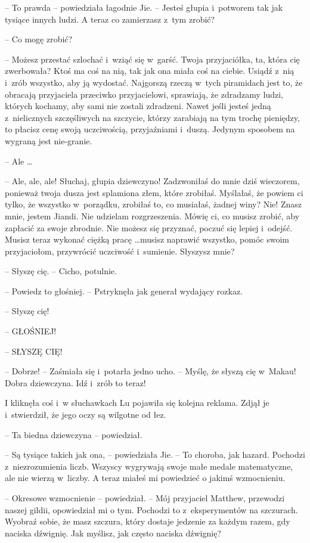 \documentclass[oneside,polish,11pt,rmheadings]{mwbk}
\begin{document}
-- To prawda -- powiedziała łagodnie Jie. -- Jesteś głupia i~potworem tak jak tysiące innych ludzi. A teraz co zamierzasz z~tym zrobić? 

-- Co mogę zrobić? 

-- Możesz przestać szlochać i~wziąć się w~garść. Twoja przyjaciółka, ta, która cię zwerbowała? Ktoś ma coś na nią, tak jak ona miała coś na ciebie. Usiądź z~nią i~zrób wszystko, aby ją wydostać. Najgorszą rzeczą w~tych piramidach jest to, że obracają przyjaciela przeciwko przyjacielowi, sprawiają, że zdradzamy ludzi, których kochamy, aby sami nie zostali zdradzeni. Nawet jeśli jesteś jedną z~nielicznych szczęśliwych na szczycie, którzy zarabiają na tym trochę pieniędzy, to płacisz cenę swoją uczciwością, przyjaźniami i~duszą. Jedynym sposobem na wygraną jest nie-granie.

-- Ale  \ldots 

-- Ale, ale, ale! Słuchaj, głupia dziewczyno! Zadzwoniłaś do mnie dziś wieczorem, ponieważ twoja dusza jest splamiona złem, które zrobiłaś. Myślałaś, że powiem ci tylko, że wszystko w~porządku, zrobiłaś to, co musiałaś, żadnej winy? Nie! Znasz mnie, jestem Jiandi. Nie udzielam rozgrzeszenia. Mówię ci, co musisz zrobić, aby zapłacić za swoje zbrodnie. Nie możesz się przyznać, poczuć się lepiej i~odejść. Musisz teraz wykonać ciężką pracę  \ldots  musisz naprawić wszystko, pomóc swoim przyjaciołom, przywrócić uczciwość i~sumienie. Słyszysz mnie? 

-- Słyszę cię. -- Cicho, potulnie. 

-- Powiedz to głośniej. -- Pstryknęła jak generał wydający rozkaz.

-- Słyszę cię! 

-- GŁOŚNIEJ! 

-- SŁYSZĘ CIĘ! 

-- Dobrze! -- Zaśmiała się i~potarła jedno ucho. -- Myślę, że słyszą cię w~Makau! Dobra dziewczyna. Idź i~zrób to teraz! 

I kliknęła coś i~w słuchawkach Lu pojawiła się kolejna reklama. Zdjął je i~stwierdził, że jego oczy są wilgotne od łez. 

-- Ta biedna dziewczyna -- powiedział.

-- Są tysiące takich jak ona, -- powiedziała Jie. -- To choroba, jak hazard. Pochodzi z~niezrozumienia liczb. Wszyscy wygrywają swoje małe medale matematyczne, ale nie wierzą w~liczby. A teraz miałeś mi powiedzieć o jakimś wzmocnieniu.

-- Okresowe wzmocnienie -- powiedział. -- Mój przyjaciel Matthew, przewodzi naszej gildii, opowiedział mi o tym. Pochodzi to z~eksperymentów na szczurach. Wyobraź sobie, że masz szczura, który dostaje jedzenie za każdym razem, gdy naciska dźwignię. Jak myślisz, jak często naciska dźwignię? 
\end{document}
